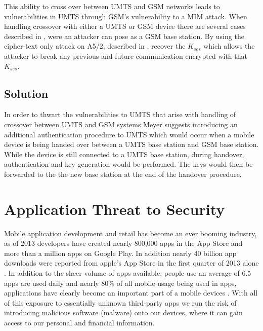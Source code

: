 \documentclass{sig-alternate}
\begin{document}
	This ability to cross over between UMTS and GSM networks leads to vulnerabilities in UMTS through GSM's vulnerability to a MIM attack. When handling crossover with either a UMTS or GSM device there are several cases described in \cite{Meyer:2004}, were an attacker can pose as a GSM base station. By using the cipher-text only attack on A5/2, described in \cite{Barkan}, recover the $K_{ses}$ which allows the attacker to break any previous and future communication encrypted with that $K_{ses}$.   
	\subsection{Solution}
	In order to thwart the vulnerabilities to UMTS that arise with handling of crossover between UMTS and GSM systems Meyer \cite{Meyer:2004} suggests introducing an additional authentication procedure to UMTS which would occur when a mobile device is being handed over between a UMTS base station and GSM base station. While the device is still connected to a UMTS base station, during handover, authentication and key generation would be performed. The keys would then be forwarded to the the new base station at the end of the handover procedure.
		
		
%		



\section{Application Threat to Security} 

 Mobile application development and retail has become an ever booming industry, as of 2013 developers have created nearly 800,000 apps in the App Store and more than a million apps on Google Play. In addition nearly 40 billion app downloads were reported from apple's App Store in the first quarter of 2013 alone \cite{Keylogging}. In addition to the sheer volume of apps available, people use an average of 6.5 apps are used daily and nearly 80\% of all mobile usage being used in apps, applications have clearly become an important part of a mobile devices \cite{mobile-usage}.  With all of this exposure to essentially unknown third-party apps we run the risk of introducing malicious software (malware) onto our devices, where it can gain access to our personal and financial information.
\end{document}
